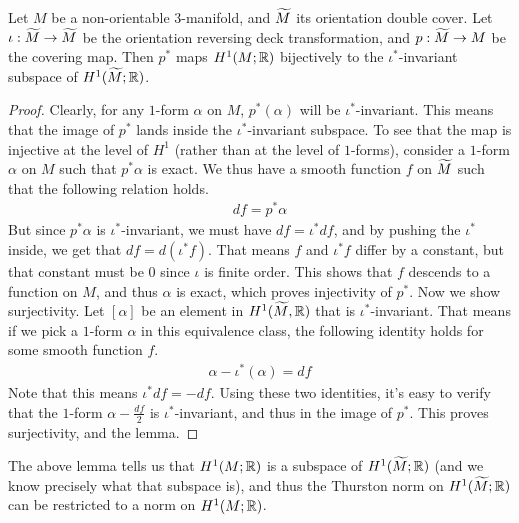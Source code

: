 \begin{lem}
  \label{lem:injective}
  Let $M$ be a non-orientable $3$-manifold, and $\widetilde{M}$ its orientation double cover. Let
  $\iota: \widetilde{M} \to \widetilde{M}$ be the orientation reversing deck transformation, and $p: \widetilde{M} \to M$
  be the covering map. Then $p^{\ast}$ maps $H^1(M; \mathbb{R})$ bijectively to the
  $\iota^{\ast}$-invariant subspace of $H^1(\widetilde{M}; \mathbb{R})$.
\end{lem}
\begin{proof}
    Clearly, for any $1$-form $\alpha$ on $M$, $p^{\ast}(\alpha)$ will be $\iota^{\ast}$-invariant. This means that the image of $p^{\ast}$ lands inside the $\iota^{\ast}$-invariant subspace. To see that the map is injective at the level of $H^1$ (rather than at the level of $1$-forms), consider a $1$-form $\alpha$ on $M$ such that $p^{\ast}\alpha$ is exact. We thus have a smooth function $f$ on $\widetilde{M}$ such that the following relation holds.
    \begin{align*}
        df = p^{\ast} \alpha
    \end{align*}
    But since $p^{\ast}\alpha$ is $\iota^{\ast}$-invariant, we must have $df = \iota^{\ast} df$, and by pushing the $\iota^{\ast}$ inside, we get that $df = d(\iota^{\ast}f)$. That means $f$ and $\iota^{\ast}f$ differ by a constant, but that constant must be $0$ since $\iota$ is finite order. This shows that $f$ descends to a function on $M$, and thus $\alpha$ is exact, which proves injectivity of $p^{\ast}$. Now we show surjectivity. Let $[\alpha]$ be an element in $H^1(\widetilde{M}, \mathbb{R})$ that is $\iota^{\ast}$-invariant. That means if we pick a $1$-form $\alpha$ in this equivalence class, the following identity holds for some smooth function $f$.
    \begin{align*}
        \alpha - \iota^{\ast}(\alpha) = df
    \end{align*}
    Note that this means $\iota^{\ast}df = -df$. Using these two identities, it's easy to verify that the $1$-form $\alpha - \frac{df}{2}$ is $\iota^{\ast}$-invariant, and thus in the image of $p^{\ast}$. This proves surjectivity, and the lemma.
\end{proof}

The above lemma tells us that $H^1(M; \mathbb{R})$ is a subspace of $H^1(\widetilde{M}; \mathbb{R})$ (and we know
precisely what that subspace is), and thus the Thurston norm on $H^1(\widetilde{M}; \mathbb{R})$ can be restricted
to a norm on $H^1(M; \mathbb{R})$.

